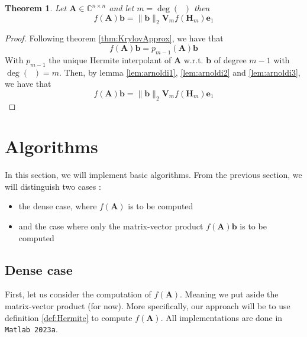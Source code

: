 \documentclass[11pt]{article}
\DeclareMathOperator{\phiAb}{\phi_{\mathbf{A},\mathbf{b}}}
\newtheorem{theorem}{Theorem}[section]
\numberwithin{equation}{section}
\begin{document}
\begin{theorem}
    Let $\mathbf{A}\in\mathbb{C}^{n\times n}$ and let $m = \deg(\phiAb)$ then
    \begin{equation}
        f(\mathbf{A})\mathbf{b} = \|\mathbf{b}\|_2\mathbf{V}_m f(\mathbf{H}_m)\mathbf{e}_1
    \end{equation}
\end{theorem}
\begin{proof}
    Following theorem \ref{thm:KrylovApprox}, we have that
    \begin{equation*}
        f(\mathbf{A})\mathbf{b} = p_{m-1}(\mathbf{A})\mathbf{b}
    \end{equation*}
    With $p_{m-1}$ the unique Hermite interpolant of $\mathbf{A}$ w.r.t. $\mathbf{b}$ of degree $m-1$ with $\deg(\phiAb)= m$. Then, by lemma \ref{lem:arnoldi1}, \ref{lem:arnoldi2} and \ref{lem:arnoldi3}, we have that
    \begin{equation*}
        f(\mathbf{A})\mathbf{b} = \|\mathbf{b}\|_2\mathbf{V}_m f(\mathbf{H}_m)\mathbf{e}_1
    \end{equation*}
\end{proof}
\section{Algorithms}
In this section, we will implement basic algorithms. From the previous section, we will distinguish two cases : 
\begin{itemize}
    \item the dense case, where $f(\mathbf{A})$ is to be computed
    \item and the case where only the matrix-vector product $f(\mathbf{A})\mathbf{b}$ is to be computed
\end{itemize}
\subsection{Dense case}
First, let us consider the computation of $f(\mathbf{A})$. Meaning we put aside the matrix-vector product (for now). More specifically, our approach will be to use definition \ref{def:Hermite} to compute $f(\mathbf{A})$. All implementations are done in \texttt{Matlab 2023a}. 
\end{document}
